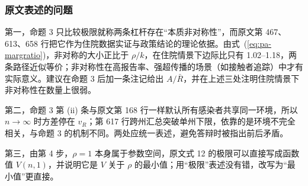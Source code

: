 \subsubsection{原文表述的问题}

第一，命题 3 只比较极限就称两条杠杆存在“本质非对称性”，而原文第 467、613、658 行把它作为住院数据实证与政策结论的理论依据。由式~(\ref{eq:pa-margratio})，非对称的大小正比于 $\rho/k$，在住院情景下边际比只有 1.02--1.18，两条路径近似等价；非对称性在高报告率、强超传播的场景（如接触者追踪）中才有实际意义。建议在命题 3 后加一条注记给出 $A/\bar R$，并在上述三处注明住院情景下非对称性在数量上很弱。

第二，命题 3 第 (ii) 条与原文第 168 行一样默认所有感染者共享同一环境，所以 $n\to\infty$ 时方差停在 $v_R$；第 617 行跨州汇总突破单州下限，依靠的是环境不完全相关，与命题 3 的机制不同。两处应统一表述，避免答辩时被指出前后矛盾。

第三，由第 4 步，$\rho=1$ 本身属于参数空间，原文式 12 的极限可以直接写成函数值 $V(n,1)$，并说明它是 $V$ 关于 $\rho$ 的最小值；用“极限”表述没有错，改写为“最小值”更直接。
